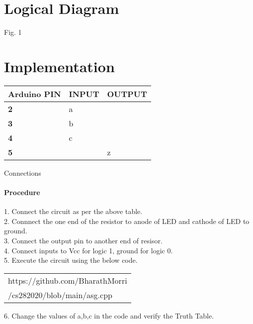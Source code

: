 \documentclass[journal,12pt,twocolumn]{IEEEtran}
\begin{document}
\section{Logical Diagram}
\begin{center}
Fig. 1 
\end{center}
\section{Implementation}
  \begin{tabularx}{0.46\textwidth} { 
  | >{\centering\arraybackslash}X 
  | >{\centering\arraybackslash}X 
  | >{\centering\arraybackslash}X  | }
\hline
\textbf{Arduino PIN} & \textbf{INPUT} & \textbf{OUTPUT} \\ 
\hline
\textbf 2 & a & \\
\hline
\textbf 3 & b & \\
\hline
\textbf 4 & c & \\
\hline
\textbf 5 & & z \\
\hline
\end{tabularx}
\begin{center}
    Connections
\end{center}
    \paragraph{Procedure}
    
    1. Connect the circuit as per the above table.\\
    2. Connnect the one end of the resistor to anode of LED and cathode of LED to ground.\\
    3. Connect the output pin to another end of resisor.\\
    4. Connect inputs to Vcc for logic 1, ground for logic 0.\\
    5. Execute the circuit using the below code.\\
   
\begin{tabularx}{0.46\textwidth} { 
  | >{\centering\arraybackslash}X |}
  \hline
  https://github.com/BharathMorri\\
	/cs282020/blob/main/asg.cpp\\
  \hline
\end{tabularx}
   
6. Change the values of a,b,c in the code and verify the Truth Table.\\

\end{document}
